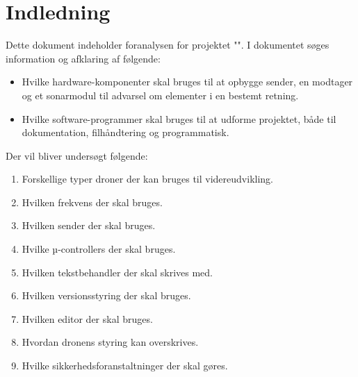 \documentclass[Main]{subfiles}
\begin{document}
\chapter{Indledning}

Dette dokument indeholder foranalysen for projektet "\ProjectName".
I dokumentet søges information og afklaring af følgende:
\begin{itemize}
\item Hvilke hardware-komponenter skal bruges til at opbygge sender, en modtager og et sonarmodul til advarsel om elementer i en bestemt retning.
\item Hvilke software-programmer skal bruges til at udforme projektet, både til dokumentation, filhåndtering og programmatisk.
\end{itemize}

Der vil bliver undersøgt følgende:
\begin{enumerate}[label=P\arabic{enumi}.]
\item Forskellige typer droner der kan bruges til videreudvikling.
\item Hvilken frekvens der skal bruges.
\item Hvilken sender der skal bruges.
\item Hvilke µ-controllers der skal bruges.
\item Hvilken tekstbehandler der skal skrives med.
\item Hvilken versionsstyring der skal bruges.
\item Hvilken editor der skal bruges.
\item Hvordan dronens styring kan overskrives.
\item Hvilke sikkerhedsforanstaltninger der skal gøres.
\end{enumerate}
\end{document}
